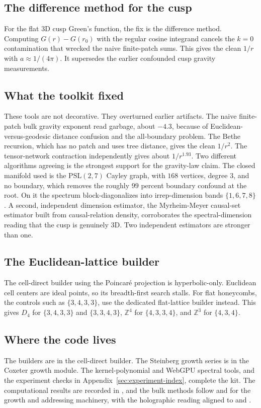 \subsection{The difference method for the cusp}

For the flat 3D cusp Green's function, the fix is the difference method. Computing $G(r) - G(r_0)$ with the regular
cosine integrand cancels the $k = 0$ contamination that wrecked the naive finite-patch sums. This gives the clean
$1/r$ with $a \approx 1/(4\pi)$. It supersedes the earlier confounded cusp gravity measurements.

\subsection{What the toolkit fixed}

These tools are not decorative. They overturned earlier artifacts. The naive finite-patch bulk gravity exponent
read garbage, about $-4.3$, because of Euclidean-versus-geodesic distance confusion and the all-boundary problem.
The Bethe recursion, which has no patch and uses tree distance, gives the clean $1/r^2$. The tensor-network
contraction independently gives about $1/r^{1.93}$. Two different algorithms agreeing is the strongest support for
the gravity-law claim. The closed manifold used is the $\mathrm{PSL}(2,7)$ Cayley graph, with $168$ vertices,
degree $3$, and no boundary, which removes the roughly $99$ percent boundary confound at the root. On it the
spectrum block-diagonalizes into irrep-dimension bands $\{1, 6, 7, 8\}$. A second, independent dimension
estimator, the Myrheim-Meyer causal-set estimator built from causal-relation density, corroborates the
spectral-dimension reading that the cusp is genuinely 3D. Two independent estimators are stronger than one.

\subsection{The Euclidean-lattice builder}

The cell-direct builder using the Poincar\'e projection is hyperbolic-only. Euclidean cell centers are ideal
points, so its breadth-first search stalls. For flat honeycombs, the controls such as $\{3,4,3,3\}$, use
the dedicated flat-lattice builder instead. This gives $D_4$ for $\{3,4,3,3\}$ and
$\{3,3,4,3\}$, $\mathbb{Z}^4$ for $\{4,3,3,4\}$, and $\mathbb{Z}^3$ for $\{4,3,4\}$.

\subsection{Where the code lives}

The builders are in the cell-direct builder. The Steinberg growth series is in the Coxeter growth module. The
kernel-polynomial and WebGPU spectral tools, and the experiment checks in Appendix~\ref{sec:experiment-index},
complete the kit. The computational results are recorded
in \cite{pollard2026vibetest}, and the bulk methods follow \cite{margenstern2013} and \cite{cannon1997} for the
growth and addressing machinery, with the holographic reading aligned to \cite{maldacena1998} and
\cite{ryu2006}.
